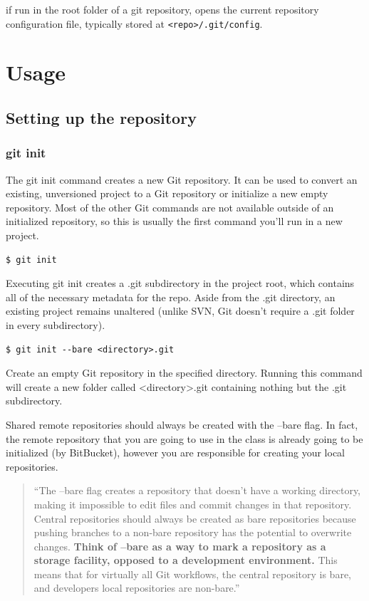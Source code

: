 \documentclass{article}
\newif\ifinstall
\begin{document}
if run in the root folder of a git repository, opens the current
repository configuration file, typically stored at
\texttt{<repo>/.git/config}. 



\ifinstall
\else
\section{Usage}

\subsection{Setting up the repository}

\subsubsection*{git init}

The git init command creates a new Git repository. It can be used to
convert an existing, unversioned project to a Git repository or
initialize a new empty repository. Most of the other Git commands are
not available outside of an initialized repository, so this is usually
the first command you'll run in a new project. 

\begin{lstlisting}
$ git init
\end{lstlisting}

Executing git init creates a .git subdirectory in the project root,
which contains all of the necessary metadata for the repo. Aside from
the .git directory, an existing project remains unaltered (unlike SVN,
Git doesn't require a .git folder in every subdirectory). 

\begin{lstlisting}
$ git init --bare <directory>.git
\end{lstlisting}

Create an empty Git repository in the specified directory. Running
this command will create a new folder called <directory>.git containing
nothing but the .git subdirectory.

Shared remote repositories should always be created with the --bare
flag. In fact, the remote repository that you are going to use in the
class is already going to be initialized (by BitBucket), however you are responsible
for creating your local repositories.

\blockquote{
``The --bare flag creates a repository that doesn't have a working directory, making it impossible to edit files and commit changes in that repository. Central repositories should always be created as bare repositories because pushing branches to a non-bare repository has the potential to overwrite changes. \textbf{Think of --bare as a way to mark a repository as a storage facility, opposed to a development environment.} This means that for virtually all Git workflows, the central repository is bare, and developers local repositories are non-bare.''
}
\end{document}
